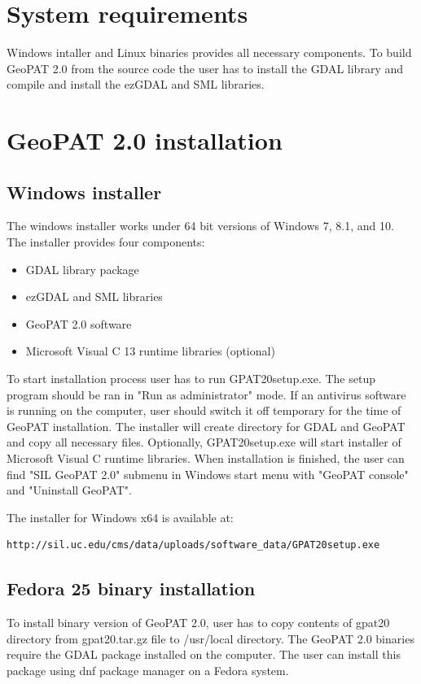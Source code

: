 \documentclass[12pt,margin=0.5in]{article}
\begin{document}
\begin{appendices}

\section{System requirements}
Windows intaller and Linux binaries provides all necessary components. 
To build GeoPAT 2.0 from the source code the user has to install the GDAL library and compile and install the ezGDAL and SML libraries.

\section{GeoPAT 2.0 installation}

\subsection{Windows installer}
The windows installer works under 64 bit versions of Windows 7, 8.1, and 10.
The installer provides four components:
\begin{itemize}
  \item{GDAL library package}
  \item{ezGDAL and SML libraries}
  \item{GeoPAT 2.0 software}
  \item{Microsoft Visual C 13 runtime libraries (optional)}
\end{itemize}
To start installation process user has to run GPAT20setup.exe.
The setup program should be ran in "Run as administrator" mode.
If an antivirus software is running on the computer, user should 
switch it off temporary for the time of GeoPAT installation.
The installer will create directory for GDAL and GeoPAT and 
copy all necessary files. Optionally, GPAT20setup.exe will
start installer of Microsoft Visual C runtime libraries.
When installation is finished, the user can find "SIL GeoPAT 2.0"
submenu in Windows start menu with "GeoPAT console" and "Uninstall GeoPAT".

The installer for Windows x64 is available at:

\begin{lstlisting}[frame=single]
http://sil.uc.edu/cms/data/uploads/software_data/GPAT20setup.exe
\end{lstlisting}

\subsection{Fedora 25 binary installation}
To install binary version of GeoPAT 2.0, user has to copy contents
of gpat20 directory from gpat20.tar.gz file to /usr/local directory.
The GeoPAT 2.0 binaries require the GDAL package installed on the computer.
The user can install this package using dnf package manager on a Fedora system.


\end{appendices}
\end{document}
